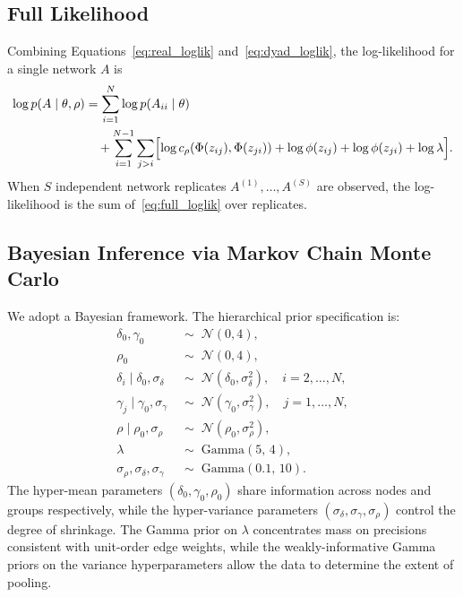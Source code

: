 \subsection{Full Likelihood}

Combining Equations~\eqref{eq:real_loglik}
and~\eqref{eq:dyad_loglik}, the log-likelihood for a single
network $A$ is
%
\begin{align}
\label{eq:full_loglik}
\log p(A \mid \theta, \rho)
  &= \sum_{i=1}^{N} \log p(A_{ii} \mid \theta) \nonumber \\
  &\quad+
    \sum_{i=1}^{N-1}\sum_{j>i}
    \Bigl[
      \log c_\rho\!\left(\Phi(z_{ij}),\Phi(z_{ji})\right)
      + \log\phi(z_{ij}) + \log\phi(z_{ji}) + \log\lambda
    \Bigr].
\end{align}
%
When $S$ independent network replicates $A^{(1)},\ldots,A^{(S)}$ are
observed, the log-likelihood is the sum of~\eqref{eq:full_loglik} over
replicates.

\subsection{Bayesian Inference via Markov Chain Monte Carlo}

We adopt a Bayesian framework.  The hierarchical prior specification is:
%
\begin{align}
\delta_0, \gamma_0 &\;\sim\; \mathcal{N}(0, 4),
  \label{eq:prior_hyper} \\
\rho_0 &\;\sim\; \mathcal{N}(0, 4), \\
\delta_i \mid \delta_0, \sigma_\delta
  &\;\sim\; \mathcal{N}(\delta_0, \sigma_\delta^2),
  \quad i = 2,\ldots,N, \\
\gamma_j \mid \gamma_0, \sigma_\gamma
  &\;\sim\; \mathcal{N}(\gamma_0, \sigma_\gamma^2),
  \quad j = 1,\ldots,N, \\
\rho \mid \rho_0, \sigma_\rho
  &\;\sim\; \mathcal{N}(\rho_0, \sigma_\rho^2), \\
\lambda &\;\sim\; \mathrm{Gamma}(5,\, 4), \\
\sigma_\rho, \sigma_\delta, \sigma_\gamma
  &\;\sim\; \mathrm{Gamma}(0.1,\, 10).
  \label{eq:prior_sigma}
\end{align}
%
The hyper-mean parameters $(\delta_0, \gamma_0, \rho_0)$ share
information across nodes and groups respectively, while the
hyper-variance parameters $(\sigma_\delta, \sigma_\gamma, \sigma_\rho)$
control the degree of shrinkage.  The Gamma prior on $\lambda$
concentrates mass on precisions consistent with unit-order edge weights,
while the weakly-informative Gamma priors on the variance hyperparameters
allow the data to determine the extent of pooling.

